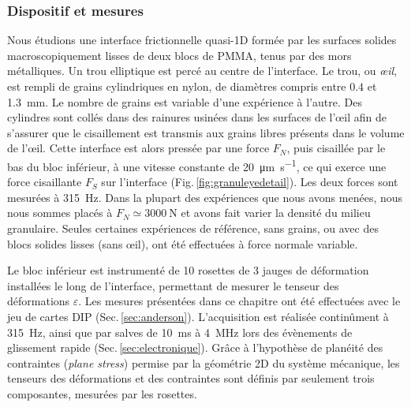 
\newpage

\subsubsection{Dispositif et mesures}

Nous étudions une interface frictionnelle quasi-1D formée par les surfaces solides macroscopiquement lisses de deux blocs de PMMA, tenus par des mors métalliques. Un trou elliptique est percé au centre de l'interface. Le trou, ou \textit{œil}, est rempli de grains cylindriques en nylon, de diamètres compris entre $0.4$ et \SI{1.3}{\milli\meter}. Le nombre de grains est variable d'une expérience à l'autre. Des cylindres sont collés dans des rainures usinées dans les surfaces de l'œil afin de
s'assurer que le cisaillement est transmis aux grains libres présents dans le volume de l'œil.
Cette interface est alors pressée par une force $F_N$, puis cisaillée par le bas du bloc inférieur, à une vitesse constante de \SI{20}{\micro\meter\per\second}, ce qui exerce une force cisaillante $F_S$ sur l'interface (Fig.\,\ref{fig:granuleyedetail}). Les deux forces sont mesurées à \SI{315}{\hertz}. Dans la plupart des expériences que nous avons menées, nous nous sommes placés à $F_N\simeq\SI{3000}{\newton}$ et avons fait varier la densité du milieu granulaire. Seules certaines expériences de référence, sans grains, ou avec des blocs solides lisses (sans œil), ont été effectuées à force normale variable.



Le bloc inférieur est instrumenté de 10 rosettes de 3 jauges de déformation installées le long de l'interface, permettant de mesurer le tenseur des déformations $\varepsilon$.
Les mesures présentées dans ce chapitre ont été effectuées avec le jeu de cartes DIP (Sec.\,\ref{sec:anderson}). L'acquisition est réalisée continûment à \SI{315}{\hertz}, ainsi que par salves de \SI{10}{\milli\second} à \SI{4}{\mega\hertz} lors des évènements de glissement rapide (Sec.\,\ref{sec:electronique}). Grâce à l'hypothèse de planéité des contraintes (\textit{plane stress}) permise par la géométrie 2D du système mécanique, les tenseurs des déformations et des contraintes sont définis par seulement trois composantes, mesurées par les rosettes.


